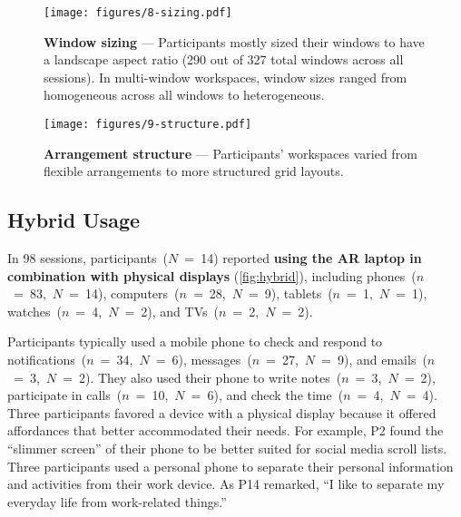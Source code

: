 \begin{figure}[t]
    \centering
    \texttt{[image: figures/8-sizing.pdf]}
    \caption{\textbf{Window sizing} --- Participants mostly sized their windows to have a landscape aspect ratio (290 out of 327 total windows across all sessions). In multi-window workspaces, window sizes ranged from homogeneous across all windows to heterogeneous.}
    \label{fig:window-sizing}
    \vspace{-1em}
\end{figure}

\begin{figure}[t]
    \centering
    \texttt{[image: figures/9-structure.pdf]}
    \caption{\textbf{Arrangement structure} --- Participants' workspaces varied from flexible arrangements to more structured grid layouts.}
    \label{fig:structure}
\end{figure}

\subsection{Hybrid Usage}
\label{sec:hybrid}

In 98 sessions, 
participants~($N$~=~14) reported \textbf{using the AR laptop in combination with physical displays} (\autoref{fig:hybrid}), 
including phones~($n$~=~83,~$N$~=~14), 
computers~($n$~=~28,~$N$~=~9), 
tablets~($n$~=~1,~$N$~=~1), 
watches~($n$~=~4,~$N$~=~2), 
and TVs~($n$~=~2,~$N$~=~2).

Participants typically used a mobile phone to check and respond to notifications~($n$~=~34,~$N$~=~6),
messages~($n$~=~27,~$N$~=~9),
and emails~($n$~=~3,~$N$~=~2).
They also used their phone to write notes~($n$~=~3,~$N$~=~2), 
participate in calls~($n$~=~10,~$N$~=~6), 
and check the time~($n$~=~4,~$N$~=~4). 
Three participants favored a device with a physical display because it offered affordances that better accommodated their needs. 
For example, P2 found the ``slimmer screen'' of their phone to be better suited for social media scroll lists.
Three participants used a personal phone to separate their personal information and activities from their work device.
As P14 remarked, 
``I like to separate my everyday life from work-related things.''


